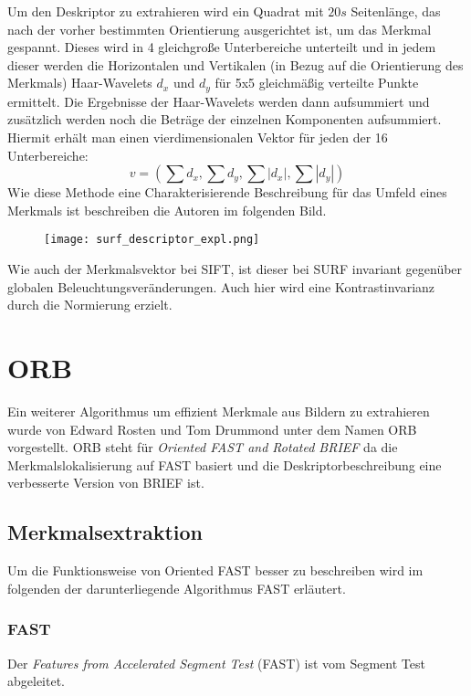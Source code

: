 Um den Deskriptor zu extrahieren wird ein Quadrat mit $20s$ Seitenlänge, das nach der vorher bestimmten Orientierung ausgerichtet ist, um das Merkmal gespannt.
Dieses wird in 4 gleichgroße Unterbereiche unterteilt und in jedem dieser werden die Horizontalen und Vertikalen (in Bezug auf die Orientierung des Merkmals) Haar-Wavelets $d_x$ und $d_y$ für 5x5 gleichmäßig verteilte Punkte ermittelt. 
Die Ergebnisse der Haar-Wavelets werden dann aufsummiert und zusätzlich werden noch die Beträge der einzelnen Komponenten aufsummiert.
Hiermit erhält man einen vierdimensionalen Vektor für jeden der 16 Unterbereiche:
\begin{equation}
v=(\sum d_x, \sum d_y, \sum |d_x|, \sum |d_y|)
\end{equation}
Wie diese Methode eine Charakterisierende Beschreibung für das Umfeld eines Merkmals ist beschreiben die Autoren im folgenden Bild.

\begin{figure}[h]
\texttt{[image: surf\_descriptor\_expl.png]}
\centering
\end{figure}

Wie auch der Merkmalsvektor bei SIFT, ist dieser bei SURF invariant gegenüber globalen Beleuchtungsveränderungen. Auch hier wird eine Kontrastinvarianz durch die Normierung erzielt. 
\cite{bay08}

\section{ORB}

Ein weiterer Algorithmus um effizient Merkmale aus Bildern zu extrahieren wurde von Edward Rosten und Tom Drummond unter dem Namen ORB vorgestellt.
ORB steht für \emph{Oriented FAST and Rotated BRIEF} da die Merkmalslokalisierung auf FAST basiert und die Deskriptorbeschreibung eine verbesserte Version von BRIEF ist.

\subsection{Merkmalsextraktion}
Um die Funktionsweise von Oriented FAST besser zu beschreiben wird im folgenden der darunterliegende Algorithmus FAST erläutert.
\subsubsection{FAST}

Der \emph{Features from Accelerated Segment Test} (FAST) ist vom Segment Test abgeleitet.

